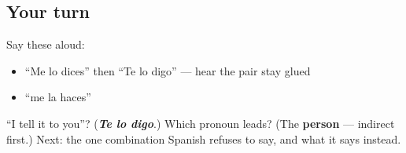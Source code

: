 \subsection*{Your turn}
Say these aloud:

\begin{itemize}
\raggedright
  \item \textquotedblleft{}Me lo dices\textquotedblright{} then \textquotedblleft{}Te lo digo\textquotedblright{} — hear the pair stay glued
  \item \textquotedblleft{}me la haces\textquotedblright{}
\end{itemize}

\begin{tcolorbox}[breakable,colback=teal!4,colframe=teal!35!black,title={Before you move on}]
\textquotedblleft{}I tell it to you\textquotedblright{}? (\emph{\textbf{Te lo digo}}.) Which pronoun leads? (The \textbf{person} — indirect first.) Next: the one combination Spanish refuses to say, and what it says instead.
\end{tcolorbox}
